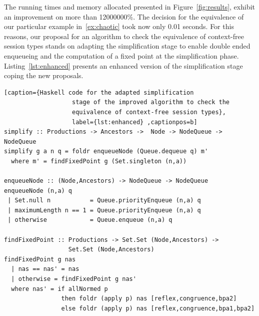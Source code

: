 The running times and memory allocated presented in 
Figure~\ref{fig:results}, exhibit an improvement on more 
than 12000000\%. The decision for the equivalence of our particular
example in~\eqref{ex:chaotic} took now only 0.01
seconds. For this reasons, our proposal for an
algorithm to check the equivalence of context-free session types 
stands on adapting the simplification stage to enable double ended 
enqueueing and the computation of a fixed point at the
simplification phase. Listing~\ref{lst:enhanced} presents
an enhanced version of the simplification stage coping the new
proposals.
\begin{lstlisting}[caption={Haskell code for the adapted simplification
                   stage of the improved algorithm to check the 
                   equivalence of context-free session types},
                   label={lst:enhanced} ,captionpos=b] 
simplify :: Productions -> Ancestors ->  Node -> NodeQueue -> NodeQueue
simplify g a n q = foldr enqueueNode (Queue.dequeue q) m'
  where m' = findFixedPoint g (Set.singleton (n,a))

enqueueNode :: (Node,Ancestors) -> NodeQueue -> NodeQueue
enqueueNode (n,a) q
 | Set.null n           = Queue.priorityEnqueue (n,a) q
 | maximumLength n == 1 = Queue.priorityEnqueue (n,a) q
 | otherwise            = Queue.enqueue (n,a) q

findFixedPoint :: Productions -> Set.Set (Node,Ancestors) -> 
                  Set.Set (Node,Ancestors)
findFixedPoint g nas
  | nas == nas' = nas
  | otherwise = findFixedPoint g nas'
  where nas' = if allNormed p
                then foldr (apply p) nas [reflex,congruence,bpa2]
                else foldr (apply p) nas [reflex,congruence,bpa1,bpa2]
\end{lstlisting}



